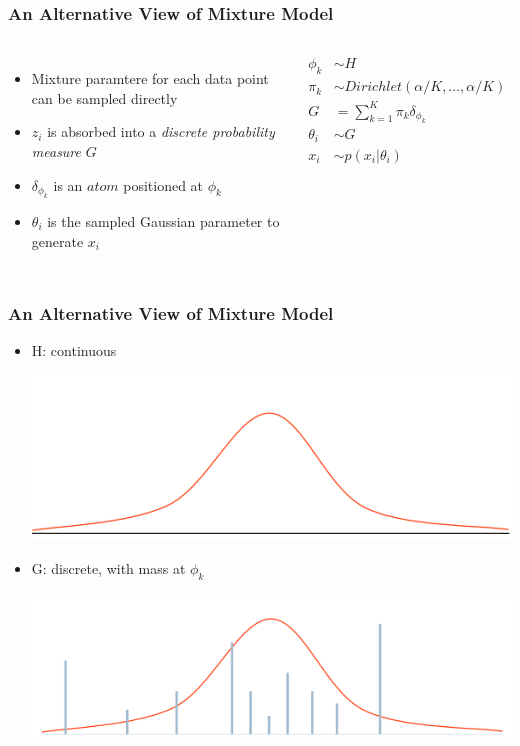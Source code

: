 \documentclass{beamer}
\begin{document}
\begin{frame}
	\frametitle{An Alternative View of Mixture Model}
	
	\begin{columns}
		\begin{itemize}
			\item	Mixture paramtere for each data point can be sampled directly
			\item	$z_i$ is absorbed into a {\em discrete probability measure} $G$
			\item	$\delta_{\phi_k}$ is an $atom$ positioned at $\phi_k$
			\item	$\theta_i$ is the sampled Gaussian parameter to generate $x_i$
		\end{itemize}
		\begin{align*}		
		\phi_k & \sim H \\
		\pi_k & \sim Dirichlet(\alpha/K, \ldots, \alpha/K) \\
		G & = \sum_{k=1}^{K}\pi_k\delta_{\phi_k} \\
		\theta_i & \sim G \\
		x_i & \sim p(x_i | \theta_i)
		\end{align*}
	\end{columns}	
\end{frame}

\begin{frame}
	\frametitle{An Alternative View of Mixture Model}
	\begin{itemize}
		\item H: continuous
		\begin{center}
			\includegraphics[width=.6\textwidth]{img/H.png}
		\end{center}
		\item G: discrete, with mass at $\phi_k$
		\begin{center}
			\includegraphics[width=.6\textwidth]{img/G.png}
		\end{center}
	\end{itemize}
\end{frame}
\end{document}
